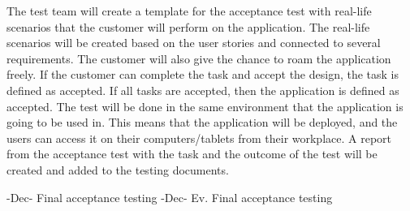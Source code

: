 %
\noindent The test team will create a template for the acceptance test with real-life scenarios that the customer will perform on the application. The real-life scenarios will be created based on the user stories and connected to several requirements. The customer will also give the chance to roam the application freely. If the customer can complete the task and accept the design, the task is defined as accepted. If all tasks are accepted, then the application is defined as accepted. The test will be done in the same environment that the application is going to be used in. This means that the application will be deployed, and the users can access it on their computers/tablets from their workplace. A report from the acceptance test with the task and the outcome of the test will be created and added to the testing documents.
\newline


-Dec- Final acceptance testing\newline
{}-Dec- Ev. Final acceptance testing\newline

